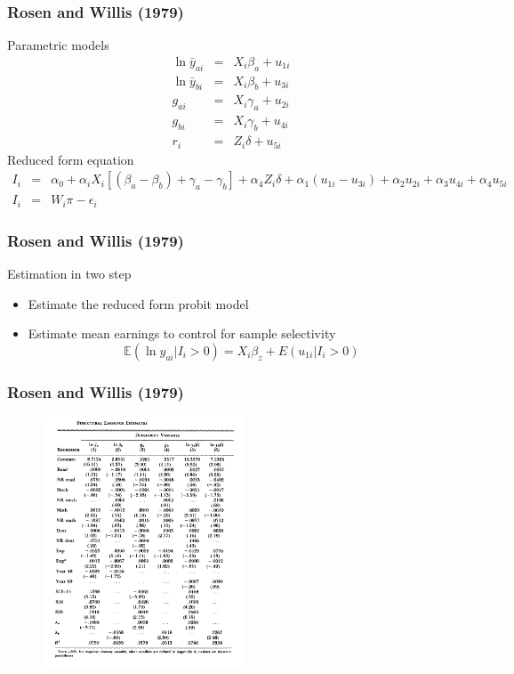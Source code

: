 \documentclass{beamer}
\newcommand{\1}{\mathbb{1}}
\newcommand{\E}{\mathbb{E}}
\begin{document}
\begin{frame}\frametitle{Rosen and Willis (1979)}
Parametric models
\begin{eqnarray*}
\ln \bar{y}_{ai} &=& X_i \beta_a + u_{1i} \\
\ln \bar{y}_{bi} &=& X_i \beta_b + u_{3i} \\
g_{ai} &=& X_i \gamma_a + u_{2i} \\
g_{bi} &=& X_i \gamma_b + u_{4i} \\
r_i  &=& Z_i \delta + u_{5i}
\end{eqnarray*}
Reduced form equation
{\scriptsize
\begin{eqnarray*}
I_i &=& \alpha_0 + \alpha_i X_i [(\beta_a -\beta_b)+\gamma_a -\gamma_b] + \alpha_4 Z_i \delta + \alpha_1 (u_{1i}-u_{3i}) + \alpha_2 u_{2i}+ \alpha_3 u_{4i} + \alpha_4 u_{5i} \\
I_i &=& W_i \pi - \epsilon_i
\end{eqnarray*}
}
\end{frame}

\begin{frame}\frametitle{Rosen and Willis (1979)}
Estimation in two step
\begin{itemize}
\item Estimate the reduced form probit model
\item Estimate mean earnings to control for sample selectivity
\begin{equation}
\E(\ln y_{ai} \vert I_i >0) = X_i \beta_z + E(u_{1i} \vert I_i>0)
\end{equation}
\end{itemize}
\end{frame}

\begin{frame}\frametitle{Rosen and Willis (1979)}
\begin{figure}[here]
\includegraphics[width=6cm]{plot/outWR}
\end{figure}
\end{frame}
\end{document}
